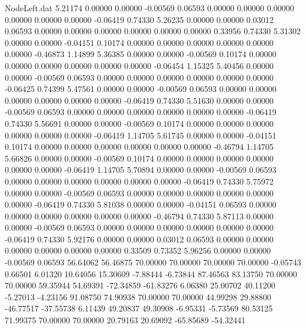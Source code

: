 \begin{filecontents}{NodeLeft.dat}
   5.21174    0.00000    0.00000    -0.00569    0.06593    0.00000    0.00000    0.00000    0.00000    0.00000    0.00000   -0.06419    0.74330
   5.26235    0.00000    0.00000     0.03012    0.06593    0.00000    0.00000    0.00000    0.00000    0.00000    0.00000    0.33956    0.74330
   5.31302    0.00000    0.00000    -0.04151    0.10174    0.00000    0.00000    0.00000    0.00000    0.00000    0.00000   -0.46873    1.14899
   5.36385    0.00000    0.00000    -0.00569    0.10174    0.00000    0.00000    0.00000    0.00000    0.00000    0.00000   -0.06454    1.15325
   5.40456    0.00000    0.00000    -0.00569    0.06593    0.00000    0.00000    0.00000    0.00000    0.00000    0.00000   -0.06425    0.74399
   5.47561    0.00000    0.00000    -0.00569    0.06593    0.00000    0.00000    0.00000    0.00000    0.00000    0.00000   -0.06419    0.74330
   5.51630    0.00000    0.00000    -0.00569    0.06593    0.00000    0.00000    0.00000    0.00000    0.00000    0.00000   -0.06419    0.74330
   5.56691    0.00000    0.00000    -0.00569    0.10174    0.00000    0.00000    0.00000    0.00000    0.00000    0.00000   -0.06419    1.14705
   5.61745    0.00000    0.00000    -0.04151    0.10174    0.00000    0.00000    0.00000    0.00000    0.00000    0.00000   -0.46794    1.14705
   5.66826    0.00000    0.00000    -0.00569    0.10174    0.00000    0.00000    0.00000    0.00000    0.00000    0.00000   -0.06419    1.14705
   5.70894    0.00000    0.00000    -0.00569    0.06593    0.00000    0.00000    0.00000    0.00000    0.00000    0.00000   -0.06419    0.74330
   5.75972    0.00000    0.00000    -0.00569    0.06593    0.00000    0.00000    0.00000    0.00000    0.00000    0.00000   -0.06419    0.74330
   5.81038    0.00000    0.00000    -0.04151    0.06593    0.00000    0.00000    0.00000    0.00000    0.00000    0.00000   -0.46794    0.74330
   5.87113    0.00000    0.00000    -0.00569    0.06593    0.00000    0.00000    0.00000    0.00000    0.00000    0.00000   -0.06419    0.74330
   5.92176    0.00000    0.00000     0.03012    0.06593    0.00000    0.00000    0.00000    0.00000    0.00000    0.00000    0.33509    0.73352
   5.96256    0.00000    0.00000    -0.00569    0.06593   56.64062   56.46875   70.00000   70.00000   70.00000   70.00000   -0.05743    0.66501
   6.01320   10.64056   15.30609    -7.88444   -6.73844   87.46563   83.13750   70.00000   70.00000   59.35944   54.69391  -72.34859  -61.83276
   6.06380   25.00702   40.11200    -5.27013   -4.23156   91.08750   74.90938   70.00000   70.00000   44.99298   29.88800  -46.77517  -37.55738
   6.11439   49.20837   49.30908    -6.95331   -5.73569   80.53125   71.99375   70.00000   70.00000   20.79163   20.69092  -65.85689  -54.32441

\end{filecontents}
